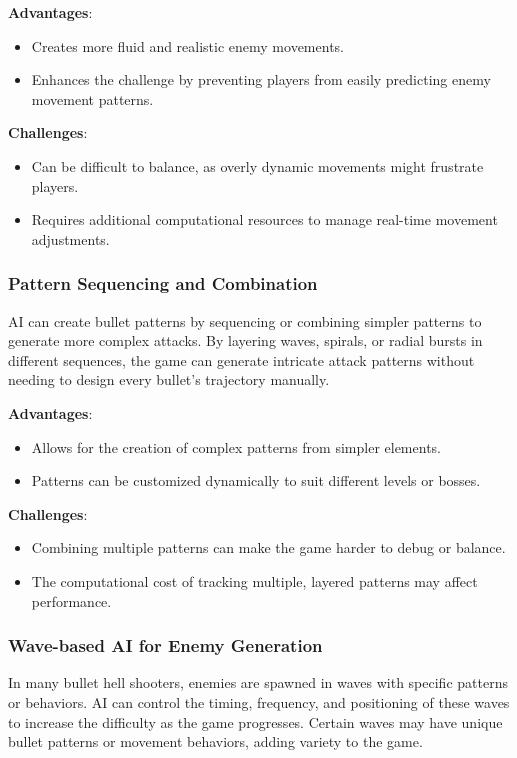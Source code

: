 \textbf{Advantages}:
\begin{itemize}
    \item Creates more fluid and realistic enemy movements.
    \item Enhances the challenge by preventing players from easily predicting enemy movement patterns.
\end{itemize}

\textbf{Challenges}:
\begin{itemize}
    \item Can be difficult to balance, as overly dynamic movements might frustrate players.
    \item Requires additional computational resources to manage real-time movement adjustments.
\end{itemize}

\subsubsection{Pattern Sequencing and Combination}

AI can create bullet patterns by sequencing or combining simpler patterns to generate more complex attacks. By layering waves, spirals, or radial bursts in different sequences, the game can generate intricate attack patterns without needing to design every bullet’s trajectory manually.

\textbf{Advantages}:
\begin{itemize}
    \item Allows for the creation of complex patterns from simpler elements.
    \item Patterns can be customized dynamically to suit different levels or bosses.
\end{itemize}

\textbf{Challenges}:
\begin{itemize}
    \item Combining multiple patterns can make the game harder to debug or balance.
    \item The computational cost of tracking multiple, layered patterns may affect performance.
\end{itemize}

\subsubsection{Wave-based AI for Enemy Generation}

In many bullet hell shooters, enemies are spawned in waves with specific patterns or behaviors. AI can control the timing, frequency, and positioning of these waves to increase the difficulty as the game progresses. Certain waves may have unique bullet patterns or movement behaviors, adding variety to the game.

